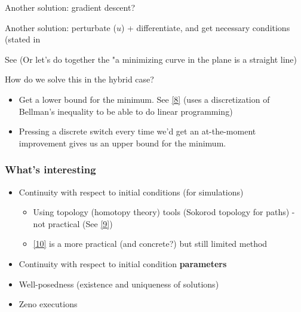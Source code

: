 \documentclass{beamer}
\begin{document}
\begin{frame}
	Another solution: gradient descent?
\end{frame}

\begin{frame}
	Another solution: perturbate ($u$) + differentiate, and get necessary conditions (stated in
	
	See %
	(Or let's do together the "a minimizing curve in the plane is a straight line) %
\end{frame}

\begin{frame}
 How do we solve this in the hybrid case?
\begin{itemize}
	\item Get a lower bound for the minimum. See \href{<http://citeseerx.ist.psu.edu/viewdoc/download?doi=10.1.1.66.8562&rep=rep1&type=pdf>}{[8]} (uses a discretization of Bellman's inequality to be able to do linear programming)
	\item Pressing a discrete switch every time we'd get an at-the-moment improvement gives us an upper bound for the minimum.
\end{itemize} 
 
\end{frame}




\begin{frame}
\frametitle{What's interesting}
\begin{itemize}
	\item Continuity with respect to initial conditions (for simulations)
	\begin{itemize}
		\item Using topology (homotopy theory) tools (Sokorod topology for paths) - not practical 
		(See \href{https://www.researchgate.net/publication/3792882_Regularity_of_solutions_and_homotopic_equivalence_for_hybrid_systems}{[9]})
		\item \href{https://www.researchgate.net/profile/Karl_Johansson2/publication/2920336_Dynamical_Properties_of_Hybrid_Automata/links/02e7e51aa0db91ccdc000000.pdf}{[10]}
		is a more practical (and concrete?) but still limited method	
	\end{itemize}
	\item Continuity with respect to initial condition \textbf{parameters}
	\item Well-posedness (existence and uniqueness of solutions) %
	\item Zeno executions
\end{itemize}


\end{frame}
\end{document}
